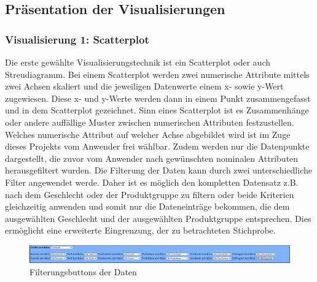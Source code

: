 \documentclass[usegeometry=true]{scrartcl}
\begin{document}
\subsection{Präsentation der Visualisierungen}
\subsubsection{Visualisierung 1: Scatterplot}\label{Visualisierung1}
Die erste gewählte Visualisierungstechnik ist ein Scatterplot oder auch Streudiagramm. Bei einem Scatterplot werden zwei numerische Attribute mittels zwei Achsen skaliert und die
jeweiligen Datenwerte einem x- sowie y-Wert zugewiesen. Diese x- und y-Werte werden dann in einem Punkt zusammengefasst und in dem Scatterplot gezeichnet. Sinn eines Scatterplot
ist es Zusammenhänge oder andere auffällige Muster zwischen numerischen Attributen festzustellen. \cite[103]{Friendly2005} Welches numerische Attribut auf welcher Achse
abgebildet wird ist im Zuge dieses Projekts vom Anwender frei wählbar. Zudem werden nur die Datenpunkte dargestellt, die zuvor vom Anwender nach gewünschten nominalen
Attributen herausgefiltert wurden. Die Filterung der Daten kann durch zwei unterschiedliche Filter angewendet werde. Daher ist es möglich den kompletten Datensatz z.B. nach
dem Geschlecht oder der Produktgruppe zu filtern oder beide Kriterien gleichzeitig anwenden und somit nur die Dateneinträge bekommen, die dem ausgewählten Geschlecht und der
ausgewählten Produktgruppe entsprechen. Dies ermöglicht eine erweiterte Eingrenzung, der zu betrachteten Stichprobe. \\
\begin{figure} [H]
	\begin{center}
		\includegraphics[width=16cm]{IMG/Filterung}
		\caption{Filterungsbuttons der Daten}
		\label{fig:Filterung}
	\end{center}
\end{figure}
\end{document}
